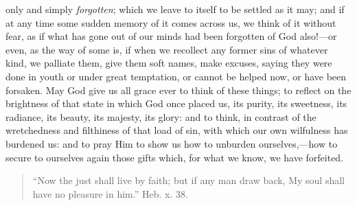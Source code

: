 only and simply \emph{forgotten}; which we leave to itself to be
settled as it may; and if at any time some sudden memory of it comes
across us, we think of it without fear, as if what has gone out of our
minds had been forgotten of God also!—or even, as the way of some
is, if when we recollect any former sins of whatever kind, we palliate
them, give them soft names, make excuses, saying they were done in
youth or under great temptation, or cannot be helped now, or have been
forsaken. May God give us all grace ever to think of these things; to
reflect on the brightness of that state in which God once placed us,
its purity, its sweetness, its radiance, its beauty, its majesty, its
glory: and to think, in contrast of the wretchedness and filthiness of
that load of sin, with which our own wilfulness has burdened us: and
to pray Him to show us how to unburden ourselves,—how to secure to
ourselves again those gifts which, for what we know, we have
forfeited.


\begin{quote}

``Now the just shall live by faith; but if any man draw back,
My soul shall have no pleasure in him.'' Heb. x. 38.

\end{quote}

